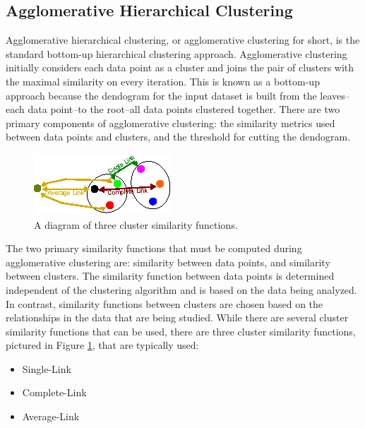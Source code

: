 \documentclass[12pt]{ucthesis}
\begin{document}
      \subsection{Agglomerative Hierarchical Clustering}\label{sec:agglomerative}
         \textsf{Agglomerative hierarchical clustering}, or
         \textsf{agglomerative clustering} for short, is the standard bottom-up
         hierarchical clustering approach. \textsf{Agglomerative clustering}
         initially considers each data point as a cluster and joins the pair of
         clusters with the maximal similarity on every iteration. This is
         known as a bottom-up approach because the dendogram for the input
         dataset is built from the leaves--each data point--to the root--all
         data points clustered together. There are two primary components of
         \textsf{agglomerative clustering}: the similarity metrics used between
         data points and clusters, and the threshold for cutting the dendogram.
         
         \begin{figure}[t]
            \centering
            \includegraphics[width=0.7\columnwidth]{graphics/ClusterMetrics.eps}
            \caption{A diagram of three cluster similarity functions.}
            \label{fig:cluster_metrics}
         \end{figure}

         The two primary similarity functions that must be computed during
         \textsf{agglomerative clustering} are: similarity between data points,
         and similarity between clusters. The similarity function between data
         points is determined independent of the clustering algorithm and is
         based on the data being analyzed. In contrast, similarity functions
         between clusters are chosen based on the relationships in the data
         that are being studied. While there are several cluster similarity
         functions that can be used, there are three cluster similarity
         functions, pictured in Figure \ref{fig:cluster_metrics}, that are
         typically used:
         \begin{itemize}
            \item Single-Link
            \item Complete-Link
            \item Average-Link
         \end{itemize}
\end{document}
